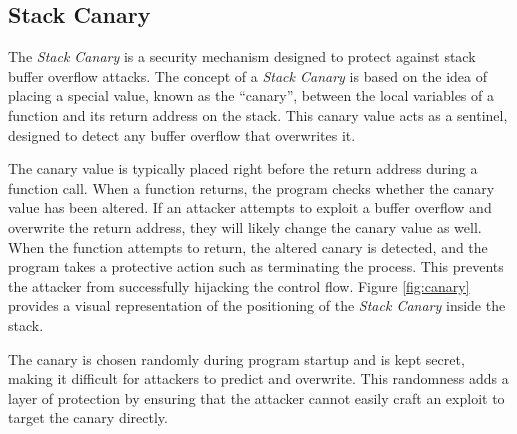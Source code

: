 \subsection{Stack Canary}
\label{subsec:background_canaries}

The \textit{Stack Canary} is a security mechanism designed to protect against
stack buffer overflow attacks. The concept of a \textit{Stack Canary} is based
on the idea of placing a special value, known as the ``canary'', between the
local variables of a function and its return address on the stack. This canary value
acts as a sentinel, designed to detect any buffer overflow that overwrites it.

The canary value is typically placed right before the return address during a
function call. When a function returns, the program checks whether the canary
value has been altered. If an attacker attempts to exploit a buffer overflow and
overwrite the return address, they will likely change the canary value as well. When
the function attempts to return, the altered canary is detected, and the program
takes a protective action such as terminating the process. This prevents the
attacker from successfully hijacking the control flow. Figure \ref{fig:canary} provides
a visual representation of the positioning of the \textit{Stack Canary} inside
the stack.

The canary is chosen randomly during program startup and is kept secret, making it
difficult for attackers to predict and overwrite. This randomness adds a layer
of protection by ensuring that the attacker cannot easily craft an exploit to
target the canary directly.

